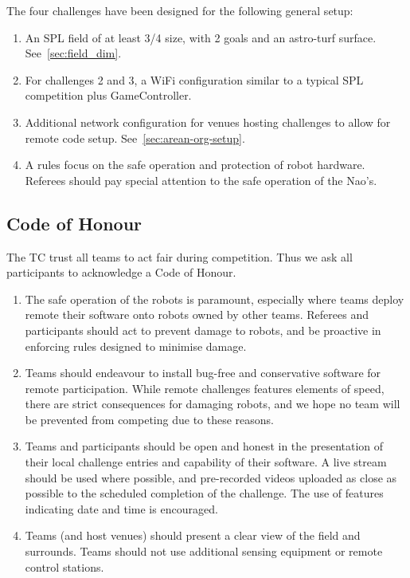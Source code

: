 The four challenges have been designed for the following general setup:
\begin{enumerate}
    \item An SPL field of at least 3/4 size, with 2 goals and an astro-turf surface. See~\ref{sec:field_dim}.
    \item For challenges 2 and 3, a WiFi configuration similar to a typical SPL competition plus GameController. 
    \item Additional network configuration for venues hosting challenges to allow for remote code setup. See~\ref{sec:arean-org-setup}.
    \item A rules focus on the safe operation and protection of robot hardware. Referees should pay special attention to the safe operation of the Nao's.
\end{enumerate}

\subsection{Code of Honour}

The TC trust all teams to act fair during competition. Thus we ask all participants to acknowledge a Code of Honour.
\begin{enumerate}
    \item The safe operation of the robots is paramount, especially where teams deploy remote their software onto robots owned by other teams. Referees and participants should act to prevent damage to robots, and be proactive in enforcing rules  designed to minimise damage.
    \item Teams should endeavour to install bug-free and conservative software for remote participation. While remote challenges features elements of speed, there are strict consequences for damaging robots, and we hope no team will be prevented from competing due to these reasons.
    \item Teams and participants should be open and honest in the presentation of their local challenge entries and capability of their software.  A live stream should be used where possible, and pre-recorded videos uploaded as close as possible to the scheduled completion of the challenge. The use of features indicating date and time is encouraged.
    \item Teams (and host venues) should present a clear view of the field and surrounds. Teams should not use additional sensing equipment or remote control stations.
\end{enumerate} 

